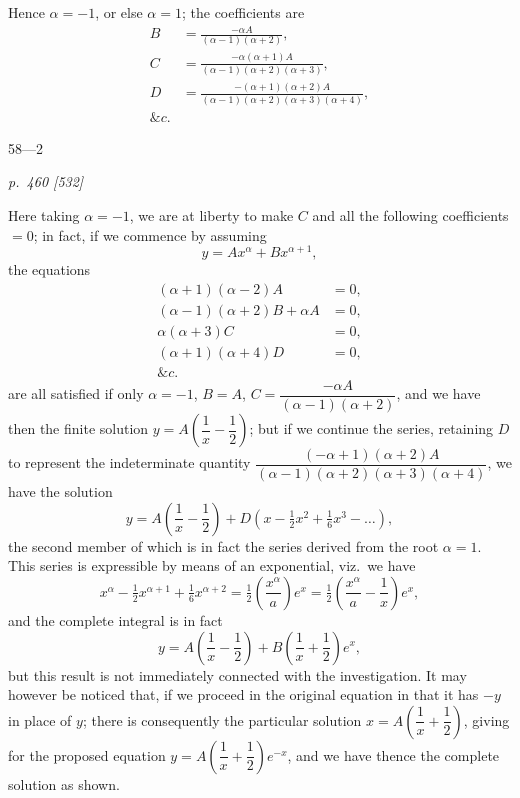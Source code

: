 \documentclass[11pt,a4paper]{book}
\begin{document}
Hence $\alpha = -1$, or else $\alpha = 1$; the coefficients are
\begin{align*}
B &= \frac{-\alpha A}{(\alpha - 1)(\alpha + 2)},\\
C &= \frac{-\alpha(\alpha + 1)A}{(\alpha - 1)(\alpha + 2)(\alpha + 3)},\\
D &= \frac{-(\alpha + 1)(\alpha + 2)A}{(\alpha - 1)(\alpha + 2)(\alpha + 3)(\alpha + 4)},\\
\&c.
\end{align*}

\hfill 58---2

\clearpage

\bigskip
\textit{p.~460 [532]}
\smallskip

Here taking $\alpha = -1$, we are at liberty to make $C$ and all the following coefficients
$=0$; in fact, if we commence by assuming
\[
y = Ax^\alpha + Bx^{\alpha+1},
\]
the equations
\begin{align*}
(\alpha + 1)(\alpha - 2)A &= 0,\\
(\alpha - 1)(\alpha + 2)B + \alpha A &= 0,\\
\alpha(\alpha + 3)C &= 0,\\
(\alpha + 1)(\alpha + 4)D &= 0,\\
\&c.
\end{align*}
are all satisfied if only $\alpha = -1$, $B = A$, $C = \dfrac{-\alpha A}{(\alpha - 1)(\alpha + 2)}$, and we have then the finite
solution $y = A\left(\dfrac{1}{x} - \dfrac{1}{2}\right)$; but if we continue the series, retaining $D$ to represent the
indeterminate quantity $\dfrac{(-\alpha + 1)(\alpha + 2)A}{(\alpha - 1)(\alpha + 2)(\alpha + 3)(\alpha + 4)}$, we have the solution
\[
y = A\left(\frac{1}{x} - \frac{1}{2}\right) + D(x - \tfrac{1}{2}x^2 + \tfrac{1}{6}x^3 - \ldots),
\]
the second member of which is in fact the series derived from the root $\alpha = 1$.
This series is expressible by means of an exponential, viz.\ we have
\[
x^\alpha - \tfrac{1}{2}x^{\alpha+1} + \tfrac{1}{6}x^{\alpha+2} = \tfrac{1}{2}\left(\dfrac{x^\alpha}{a}\right)e^{x} = \tfrac{1}{2}\left(\dfrac{x^\alpha}{a} - \dfrac{1}{x}\right)e^{x},
\]
and the complete integral is in fact
\[
y = A\left(\dfrac{1}{x} - \dfrac{1}{2}\right) + B\left(\dfrac{1}{x} + \dfrac{1}{2}\right)e^{x},
\]
but this result is not immediately connected with the investigation. It may however
be noticed that, if we proceed in the original equation in that it has $-y$ in place of $y$;
there is consequently the particular solution $x = A\left(\dfrac{1}{x} + \dfrac{1}{2}\right)$, giving for the proposed
equation $y = A\left(\dfrac{1}{x} + \dfrac{1}{2}\right)e^{-x}$, and we have thence the complete solution as shown.
\end{document}
